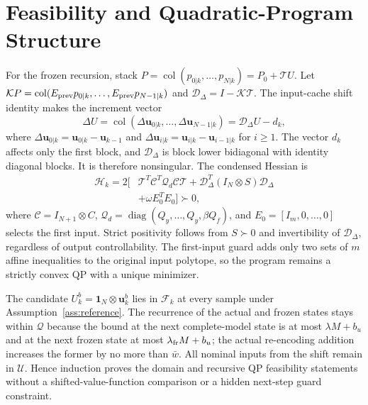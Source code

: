 \documentclass[journal]{IEEEtran}
\theoremstyle{plain}
\theoremstyle{definition}
\newcommand{\vu}{\mathbf{u}}
\newcommand{\col}{\operatorname{col}}
\begin{document}
\begingroup\color{blue}
\section{Feasibility and Quadratic-Program Structure}
\label{app:estimates}
For the frozen recursion, stack $P=\col(p_{0|k},\ldots,p_{N|k})=P_0+\mathcal T U$. Let $\mathcal K P=\col(E_{\rm prev}p_{0|k},\ldots,E_{\rm prev}p_{N-1|k})$ and $\mathcal D_\Delta=I-\mathcal K\mathcal T$. The input-cache shift identity makes the increment vector
\begin{equation}
\Delta U=\col(\Delta\vu_{0|k},\ldots,\Delta\vu_{N-1|k})
=\mathcal D_\Delta U-d_k,
\label{eq:increment_operator}
\end{equation}
where $\Delta\vu_{0|k}=\vu_{0|k}-\vu_{k-1}$ and
$\Delta\vu_{i|k}=\vu_{i|k}-\vu_{i-1|k}$ for $i\ge1$.
The vector $d_k$ affects only the first block, and $\mathcal D_\Delta$ is block lower bidiagonal with identity diagonal blocks. It is therefore nonsingular. The condensed Hessian is
\begin{equation}
\begin{split}
\mathcal H_k=2\bigl[&\mathcal T^T\mathcal C^T\mathcal Q_d
\mathcal C\mathcal T
+\mathcal D_\Delta^T(I_N\otimes S)\mathcal D_\Delta\\
&+\omega E_0^TE_0\bigr]\succ0,
\end{split}
\label{eq:QP_Hessian}
\end{equation}
where $\mathcal C=I_{N+1}\otimes C$, $\mathcal Q_d=\operatorname{diag}(Q_y,\ldots,Q_y,\beta Q_f)$, and $E_0=[I_m,0,\ldots,0]$ selects the first input. Strict positivity follows from $S\succ0$ and invertibility of $\mathcal D_\Delta$, regardless of output controllability. The first-input guard adds only two sets of $m$ affine inequalities to the original input polytope, so the program remains a strictly convex QP with a unique minimizer.

The candidate $U_k^b=\mathbf1_N\otimes\vu_k^b$ lies in $\mathcal F_k$ at every sample under Assumption~\ref{ass:reference}. The recurrence of the actual and frozen states stays within $\mathcal Q$ because the bound at the next complete-model state is at most $\lambda M+b_u$ and at the next frozen state at most $\lambda_{\rm fr}M+b_u$; the actual re-encoding addition increases the former by no more than $\bar w$. All nominal inputs from the shift remain in $\mathcal U$. Hence induction proves the domain and recursive QP feasibility statements without a shifted-value-function comparison or a hidden next-step guard constraint.
\end{document}
